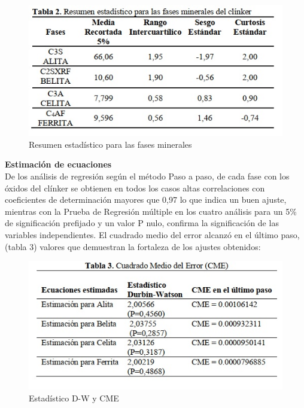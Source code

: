\documentclass[spanish]{report}
\begin{document}
\begin{figure}[h]
    \centering
    \includegraphics[width=1\linewidth]{Fig 2.jpg}
    \caption{Resumen estadístico para las fases minerales}
    \label{fig:enter-label}
\end{figure}

\textbf{Estimación de ecuaciones}\\

De los análisis de regresión según el método Paso a paso, de cada fase con los óxidos del clínker se obtienen en todos los casos altas correlaciones con coeficientes de determinación mayores que 0,97 lo que indica un buen ajuste, mientras con la Prueba de Regresión múltiple en los cuatro análisis para un 5\% de significación prefijado y un valor P nulo, confirma la significación de las variables independientes. El cuadrado medio del error alcanzó en el último paso, (tabla 3) valores que demuestran la fortaleza de los ajustes obtenidos:\\

\begin{figure}[h]
    \centering
    \includegraphics[width=1\linewidth]{Fig 3.jpg}
    \caption{Estadístico D-W y CME}
    \label{fig:enter-label}
\end{figure}
\end{document}
